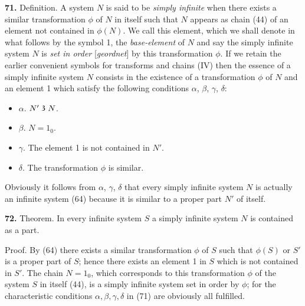 \documentclass[oneside]{book}
\newcommand\partof{\mathrel{\raisebox{0.45ex}{$\mathfrak{3}$}}}   %
\newcommand\mypara{\medskip\textbf}
\begin{document}
\mypara{71.} Definition. A system $N$ is said to be \textit{simply
infinite} when there exists a similar transformation $\phi$ of
$N$ in itself such that $N$ appears as chain (44) of an
element not contained in $\phi(N)$. We call this element,
which we shall denote in what follows by the
symbol 1, the \textit{base-element} of $N$ and say the simply
infinite system $N$ is \textit{set in order} [\textit{geordnet}] by this
transformation $\phi$. If we retain the earlier convenient
symbols for transforms and chains (IV) then the essence
of a simply infinite system $N$ consists in the
existence of a transformation $\phi$ of $N$ and an element 1
which satisfy the following conditions $\alpha$, $\beta$, $\gamma$, $\delta$:
\begin{itemize}
\item[]  $\alpha$. $N' \partof N$.

\item[]  $\beta$. $N=1_0$.

\item[]  $\gamma$. The element 1 is not contained in $N'$.

\item[]  $\delta$. The transformation $\phi$ is similar.
\end{itemize}
Obviously it follows from $\alpha$, $\gamma$, $\delta$ that every simply infinite
system $N$ is actually an infinite system (64) because
it is similar to a proper part $N'$ of itself.


\mypara{72.} Theorem. In every infinite system $S$ a simply
infinite system $N$ is contained as a part.

Proof. By (64) there exists a similar transformation
$\phi$ of $S$ such that $\phi(S)$ or $S'$ is a proper part of
$S$; hence there exists an element 1 in $S$ which is not
contained in $S'$. The chain $N=1_0$, which corresponds
to this transformation $\phi$ of the system $S$ in itself (44),
is a simply infinite system set in order by $\phi$; for the
characteristic conditions $\alpha, \beta, \gamma, \delta$ in (71) are obviously
all fulfilled.
\end{document}
